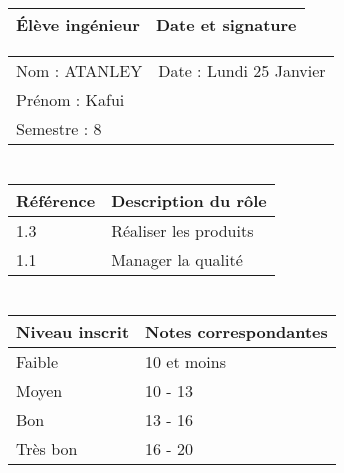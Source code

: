 \documentclass[11pt]{article}
\begin{document}

\begin{center}
\begin{table}[!hp]

	\begin{tabularx}{\linewidth}{|X|X|}
	\hline
	\rowcolor{gray!40} Élève ingénieur & Date et signature \\
	\hline
	\end{tabularx}
	\begin{tabularx}{\linewidth}{|X|X|}
	Nom : ATANLEY & Date : Lundi 25 Janvier \\ 
	Prénom : Kafui & \\
	Semestre : 8 & \\
	\hline
	\end{tabularx}
\end{table}
\end{center}

\section*{\large\FR}

\begin{table}[!hp]
\centering
	\begin{tabularx}{\linewidth}{|X|X|}
	\hline
	\rowcolor{gray!40} Référence \WBSCourt & Description du rôle \\
	\hline
	 1.3 & Réaliser les produits \\
	 \hline
	  1.1 & Manager la qualité \\
	 \hline
	\end{tabularx}
\end{table}


\section*{\large\FC}


\begin{table}[!hp]
\centering
	\begin{tabularx}{\linewidth}{|X|X|}
	\hline
	\rowcolor{gray!40} Niveau inscrit & Notes correspondantes \\
	\hline
	 Faible & 10 et moins \\
	 \hline
	 Moyen & 10 - 13 \\
	 \hline
	 Bon & 13 - 16 \\
	 \hline
	 Très bon & 16 - 20 \\
	 \hline
	\end{tabularx}
\end{table}
\end{document}
